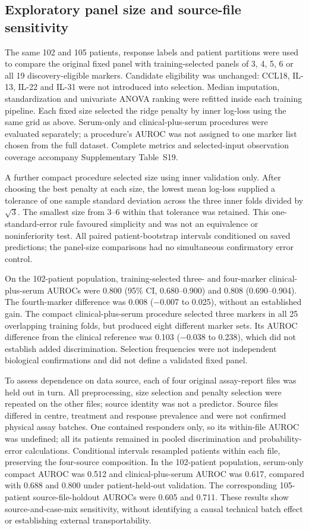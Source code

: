 \subsection{Exploratory panel size and source-file sensitivity}
The same 102 and 105 patients, response labels and patient partitions were used to compare the original fixed panel with training-selected panels of 3, 4, 5, 6 or all 19 discovery-eligible markers. Candidate eligibility was unchanged: CCL18, IL-13, IL-22 and IL-31 were not introduced into selection. Median imputation, standardization and univariate ANOVA ranking were refitted inside each training pipeline. Each fixed size selected the ridge penalty by inner log-loss using the same grid as above. Serum-only and clinical-plus-serum procedures were evaluated separately; a procedure's AUROC was not assigned to one marker list chosen from the full dataset. Complete metrics and selected-input observation coverage accompany Supplementary Table~S19.

A further compact procedure selected size using inner validation only. After choosing the best penalty at each size, the lowest mean log-loss supplied a tolerance of one sample standard deviation across the three inner folds divided by $\sqrt{3}$. The smallest size from 3--6 within that tolerance was retained. This one-standard-error rule favoured simplicity and was not an equivalence or noninferiority test. All paired patient-bootstrap intervals conditioned on saved predictions; the panel-size comparisons had no simultaneous confirmatory error control.

On the 102-patient population, training-selected three- and four-marker clinical-plus-serum AUROCs were 0.800 (95\% CI, 0.680--0.900) and 0.808 (0.690--0.904). The fourth-marker difference was 0.008 ($-$0.007 to 0.025), without an established gain. The compact clinical-plus-serum procedure selected three markers in all 25 overlapping training folds, but produced eight different marker sets. Its AUROC difference from the clinical reference was 0.103 ($-$0.038 to 0.238), which did not establish added discrimination. Selection frequencies were not independent biological confirmations and did not define a validated fixed panel.

To assess dependence on data source, each of four original assay-report files was held out in turn. All preprocessing, size selection and penalty selection were repeated on the other files; source identity was not a predictor. Source files differed in centre, treatment and response prevalence and were not confirmed physical assay batches. One contained responders only, so its within-file AUROC was undefined; all its patients remained in pooled discrimination and probability-error calculations. Conditional intervals resampled patients within each file, preserving the four-source composition. In the 102-patient population, serum-only compact AUROC was 0.512 and clinical-plus-serum AUROC was 0.617, compared with 0.688 and 0.800 under patient-held-out validation. The corresponding 105-patient source-file-holdout AUROCs were 0.605 and 0.711. These results show source-and-case-mix sensitivity, without identifying a causal technical batch effect or establishing external transportability.


